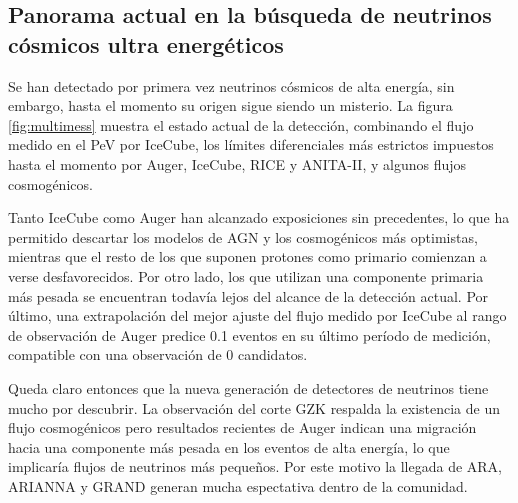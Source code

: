 	
	\subsection{Panorama actual en la b\'usqueda de neutrinos c\'osmicos ultra energ\'eticos}
	
	Se han detectado por primera vez neutrinos c\'osmicos de alta energ\'ia, sin embargo, hasta el momento su origen sigue siendo un misterio.
	La figura \ref{fig:multimess} muestra el estado actual de la detecci\'on, combinando el flujo medido en el PeV por IceCube, los l\'imites diferenciales más estrictos impuestos hasta el momento por Auger, IceCube, RICE y ANITA-II, y algunos flujos cosmog\'enicos.
	
	Tanto IceCube como Auger han alcanzado exposiciones sin precedentes, lo que ha permitido descartar los modelos de AGN y los cosmog\'enicos m\'as optimistas, mientras que el resto de los que suponen protones como primario comienzan a verse desfavorecidos.
	Por otro lado, los que utilizan una componente primaria m\'as pesada se encuentran todav\'ia lejos del alcance de la detecci\'on actual.
	Por \'ultimo, una extrapolaci\'on del mejor ajuste del flujo medido por IceCube al rango de observaci\'on de Auger predice 0.1 eventos en su \'ultimo per\'iodo de medici\'on, compatible con una observaci\'on de 0 candidatos.
	
	Queda claro entonces que la nueva generaci\'on de detectores de neutrinos tiene mucho por descubrir.
	La observaci\'on del corte GZK respalda la existencia de un flujo cosmog\'enicos pero resultados recientes de Auger indican una migraci\'on hacia una componente m\'as pesada en los eventos de alta energ\'ia, lo que implicar\'ia flujos de neutrinos m\'as peque\~nos.
	Por este motivo la llegada de ARA, ARIANNA y GRAND generan mucha espectativa dentro de la comunidad.
	\fi %

% 	
	
